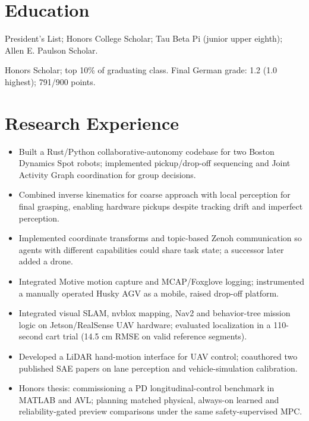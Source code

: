 \section{Education}
{\small President's List; Honors College Scholar; Tau Beta Pi (junior upper eighth); Allen E. Paulson Scholar.}\par
{}
{\small Honors Scholar; top 10\% of graduating class. Final German grade: 1.2 (1.0 highest); 791/900 points.}\par

\section{Research Experience}


\begin{itemize}\small
\item Built a Rust/Python collaborative-autonomy codebase for two Boston Dynamics Spot robots; implemented pickup/drop-off sequencing and Joint Activity Graph coordination for group decisions.
\item Combined inverse kinematics for coarse approach with local perception for final grasping, enabling hardware pickups despite tracking drift and imperfect perception.
\item Implemented coordinate transforms and topic-based Zenoh communication so agents with different capabilities could share task state; a successor later added a drone.
\item Integrated Motive motion capture and MCAP/Foxglove logging; instrumented a manually operated Husky AGV as a mobile, raised drop-off platform.
\end{itemize}
\begin{itemize}\small
\item Integrated visual SLAM, nvblox mapping, Nav2 and behavior-tree mission logic on Jetson/RealSense UAV hardware; evaluated localization in a 110-second cart trial (14.5 cm RMSE on valid reference segments).
\item Developed a LiDAR hand-motion interface for UAV control; coauthored two published SAE papers on lane perception and vehicle-simulation calibration.
\item Honors thesis: commissioning a PD longitudinal-control benchmark in MATLAB and AVL; planning matched physical, always-on learned and reliability-gated preview comparisons under the same safety-supervised MPC.
\end{itemize}

